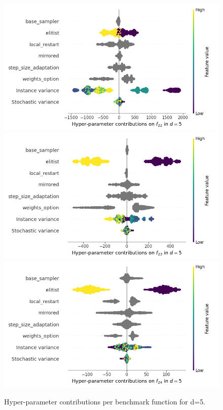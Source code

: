 \begin{figure}[t]
	\includegraphics[height=0.15\textheight,trim=60mm 0mm 30mm 0mm,clip]{images/img_summary_f22_d5.png}
	\includegraphics[height=0.15\textheight,trim=60mm 0mm 30mm 0mm,clip]{images/img_summary_f23_d5.png}
	\includegraphics[height=0.15\textheight,trim=60mm 0mm 0mm 0mm,clip]{images/img_summary_f24_d5.png}
\caption{Hyper-parameter contributions per benchmark function for d=5. \label{fig:shapxplaind5}}

\end{figure}

